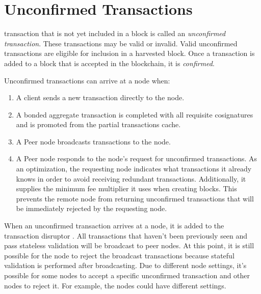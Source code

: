 \section{Unconfirmed Transactions}
\label{sec:unconfirmedTransactions}


 transaction that is not yet included in a block is called an \emph{unconfirmed transaction}.
These transactions may be valid or invalid.
Valid unconfirmed transactions are eligible for inclusion in a harvested block.
Once a transaction is added to a block that is accepted in the blockchain, it is \emph{confirmed}.

Unconfirmed transactions can arrive at a node when:
\begin{enumerate}
	\item{A client sends a new transaction directly to the node.}
	\item{A bonded aggregate transaction is completed with all requisite cosignatures and is promoted from the partial transactions cache.}
	\item{A Peer node broadcasts transactions to the node.}
	\item{A Peer node responds to the node's request for unconfirmed transactions.
	As an optimization, the requesting node indicates what transactions it already knows in order to avoid receiving redundant transactions.
	Additionally, it supplies the minimum fee multiplier  it uses when creating blocks.
	This prevents the remote node from returning unconfirmed transactions that will be immediately rejected by the requesting node.}
\end{enumerate}

When an unconfirmed transaction arrives at a node, it is added to the transaction disruptor .
All transactions that haven't been previously seen and pass stateless validation will be broadcast to peer nodes.
At this point, it is still possible for the node to reject the broadcast transactions because stateful validation is performed after broadcasting.
Due to different node settings, it's possible for some nodes to accept a specific unconfirmed transaction and other nodes to reject it.
For example, the nodes could have different  settings.

